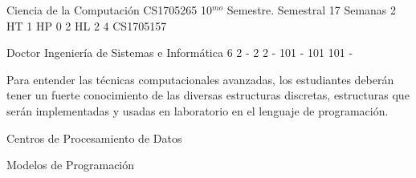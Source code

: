 \documentclass[a4paper,8pt]{article}
\begin{document}
\setNombreProfesor{}
\setGradoProfesorAbreviado{}
\sylabusHeader

\academicaTable
{Ciencia de la Computación} %
{CS1705265} %
{10$^{mo}$ Semestre.} %
{Semestral} %
{17 Semanas} %
{2 HT} %
{1 HP} %
{0} %
{2 HL}  %
{2} %
{4} %
{CS1705157} %

\administrativaTable
{Doctor} %
{Ingeniería de Sistemas e Informática} %
{6} %
{2} %
{-} %
{2} %
{2} %
{-} %
{101} %
{-} %
{101} %
{101} %
{-} %


\begin{fundamentacion}
Para entender las técnicas computacionales avanzadas, los estudiantes deberán tener un fuerte conocimiento de las
diversas estructuras discretas, estructuras que serán implementadas y usadas en laboratorio en el lenguaje de programación.

\end{fundamentacion}

\begin{sumilla}
\item \PDDistributedSystems
\item \PDCloudComputing
\item Centros de Procesamiento de Datos
\item \PDCloudComputing
\item \PDCloudComputing
\item Modelos de Programación

\end{sumilla}

\begin{competenciasAsignatura}
\item {}
\item {}
\item {}
\item {}
\item {}
\item {}

\end{competenciasAsignatura}
\end{document}
